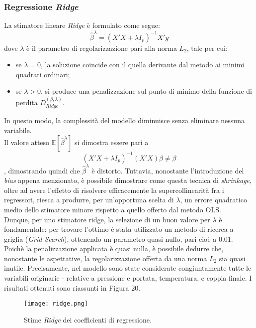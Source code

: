 \documentclass[fleqn,10pt]{SelfArx} %
\begin{document}
\subsubsection{Regressione \textit{Ridge}}
La stimatore lineare \textit{Ridge} \cite{Ridge} è formulato come segue:
\begin{equation}\label{eq}
    \hat{\beta}^{\lambda}=(X'X+\lambda I_p)^{-1}X'y
\end{equation}
dove $\lambda$ è il parametro di regolarizzazione pari alla norma $L_2$, tale per cui:
\begin{itemize}
    \item se $\lambda=0$, la soluzione coincide con il quella derivante dal metodo ai minimi quadrati ordinari;
    \item se $\lambda>0$, si produce una penalizzazione sul punto di minimo della funzione di perdita $D_{Ridge}^{(\beta,\lambda)}$.
\end{itemize}
In questo modo, la complessità del modello diminuisce senza eliminare nessuna variabile.\\
Il valore atteso $\mathbb{E}[\hat{\beta}^{\lambda}]$ si dimostra essere pari a
\begin{equation}
   (X'X+\lambda I_p)^{-1}(X'X)\beta\neq\beta 
\end{equation}
, dimostrando quindi che $\hat{\beta}^{\lambda}$ è distorto. Tuttavia, nonostante l'introduzione del \textit{bias} appena menzionato, è possibile dimostrare come questa tecnica di \textit{shrinkage}, oltre ad avere l'effetto di risolvere efficacemente la supercollinearità fra i regressori, riesca a produrre, per un'opportuna scelta di $\lambda$, un errore quadratico medio dello stimatore minore rispetto a quello offerto dal metodo OLS.\\
Dunque, per uno stimatore ridge, la selezione di un buon valore per $\lambda$ è fondamentale: per trovare l'ottimo è stata utilizzato un metodo di ricerca a griglia (\textit{Grid Search}), ottenendo un parametro quasi nullo, pari cioè a 0.01. Poichè la penalizzazione applicata è quasi nulla, è possibile dedurre che, nonostante le aspettative, la regolarizzazione offerta da una norma $L_2$ sia quasi inutile. Precisamente, nel modello sono state considerate congiuntamente tutte le variabili originarie - relative a pressione e portata, temperatura, e coppia finale. I risultati ottenuti sono riassunti in Figura 20.
\begin{figure}[h]
    \centering
    \texttt{[image: ridge.png]}
    \label{fig:em}
    \caption{Stime \textit{Ridge} dei coefficienti di regressione.}
\end{figure}
\end{document}
